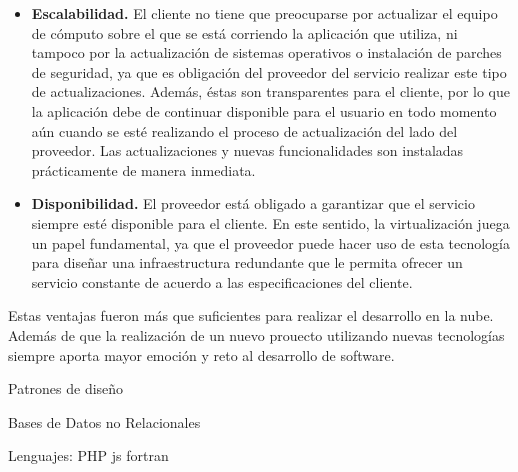 \begin{itemize}
	\item \textbf{Escalabilidad.} El cliente no tiene que preocuparse por actualizar el equipo de cómputo sobre el que se está corriendo la aplicación que utiliza, ni tampoco por la actualización de sistemas operativos o instalación de parches de seguridad, ya que es obligación del proveedor del servicio realizar este tipo de actualizaciones. Además, éstas son transparentes para el cliente, por lo que la aplicación debe de continuar disponible para el usuario en todo momento aún cuando se esté realizando el proceso de actualización del lado del proveedor. Las actualizaciones y nuevas funcionalidades son instaladas prácticamente de manera inmediata.
	
	\item \textbf{Disponibilidad.} El proveedor está obligado a garantizar que el servicio siempre esté disponible para el cliente. En este sentido, la virtualización juega un papel fundamental, ya que el proveedor puede hacer uso de esta tecnología para diseñar una infraestructura redundante que le permita ofrecer un servicio constante de acuerdo a las especificaciones del cliente.
	
\end{itemize}

Estas ventajas fueron más que suficientes para realizar el desarrollo en la nube. Además de que la realización de un nuevo prouecto utilizando nuevas tecnologías siempre aporta mayor emoción y reto al desarrollo de software.

Patrones de diseño

Bases de Datos no Relacionales

Lenguajes:
PHP
js
fortran











